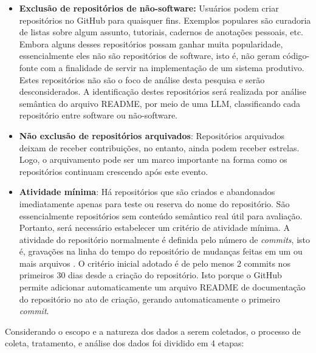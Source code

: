 \documentclass[12pt,oneside,a4paper,brazil,sumario=tradicional]{abntex2}
\begin{document}
\begin{itemize}
  \item \textbf{Exclusão de repositórios de não-software:} Usuários podem criar repositórios no GitHub para quaisquer fins. Exemplos populares são curadoria de listas sobre algum assunto, tutoriais, cadernos de anotações pessoais, etc. Embora alguns desses repositórios possam ganhar muita popularidade, essencialmente eles não são repositórios de software, isto é, não geram código-fonte com a finalidade de servir na implementação de um sistema produtivo. Estes repositórios não são o foco de análise desta pesquisa e serão desconsiderados. A identificação destes repositórios será realizada por análise semântica do arquivo README, por meio de uma LLM, classificando cada repositório entre software ou não-software.
  \item \textbf{Não exclusão de repositórios arquivados}: Repositórios arquivados deixam de receber contribuições, no entanto, ainda podem receber estrelas. Logo, o arquivamento pode ser um marco importante na forma como os repositórios continuam crescendo após este evento.
  \item \textbf{Atividade mínima}: Há repositórios que são criados e abandonados imediatamente apenas para teste ou reserva do nome do repositório. São essencialmente repositórios sem conteúdo semântico real útil para avaliação. Portanto, será necessário estabelecer um critério de atividade mínima. A atividade do repositório normalmente é definida pelo número de \textit{commits}, isto é, gravações na linha do tempo do repositório de mudanças feitas em um ou mais arquivos \parencite{github_about_commits, github2025}. O critério inicial adotado é de pelo menos 2 commits nos primeiros 30 dias desde a criação do repositório. Isto porque o GitHub permite adicionar automaticamente um arquivo README de documentação do repositório no ato de criação, gerando automaticamente o primeiro \textit{commit}.
\end{itemize}

Considerando o escopo e a natureza dos dados a serem coletados, o processo de coleta, tratamento, e análise dos dados foi dividido em 4 etapas:
\end{document}
